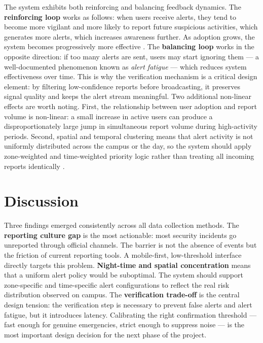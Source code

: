 \documentclass[12pt, onecolumn]{IEEEtran}
\begin{document}
The system exhibits both reinforcing and balancing feedback dynamics.
The \textbf{reinforcing loop} works as follows: when users receive
alerts, they tend to become more vigilant and more likely to report
future suspicious activities, which generates more alerts, which
increases awareness further. As adoption grows, the system becomes
progressively more effective \cite{meadows2008}. The \textbf{balancing
loop} works in the opposite direction: if too many alerts are sent,
users may start ignoring them --- a well-documented phenomenon known
as \textit{alert fatigue} --- which reduces system effectiveness over
time. This is why the verification mechanism is a critical design
element: by filtering low-confidence reports before broadcasting, it
preserves signal quality and keeps the alert stream meaningful. Two
additional non-linear effects are worth noting. First, the relationship
between user adoption and report volume is non-linear: a small increase
in active users can produce a disproportionately large jump in
simultaneous report volume during high-activity periods. Second, spatial
and temporal clustering means that alert activity is not uniformly
distributed across the campus or the day, so the system should apply
zone-weighted and time-weighted priority logic rather than treating all
incoming reports identically \cite{checkland1981}.

\section{Discussion}

Three findings emerged consistently across all data collection methods.
The \textbf{reporting culture gap} is the most actionable: most security
incidents go unreported through official channels. The barrier is not
the absence of events but the friction of current reporting tools. A
mobile-first, low-threshold interface directly targets this problem.
\textbf{Night-time and spatial concentration} means that a uniform
alert policy would be suboptimal. The system should support zone-specific
and time-specific alert configurations to reflect the real risk
distribution observed on campus. The \textbf{verification trade-off}
is the central design tension: the verification step is necessary to
prevent false alerts and alert fatigue, but it introduces latency.
Calibrating the right confirmation threshold --- fast enough for genuine
emergencies, strict enough to suppress noise --- is the most important
design decision for the next phase of the project.
\end{document}
